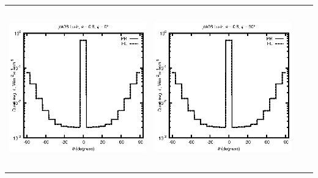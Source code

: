 \begin{tabular}{c c c c}
\includegraphics[height=7cm]{../eps/jok08_Lu_ir_fwd.eps} &
\includegraphics[height=7cm]{../eps/jok08_Lu_ir_cross.eps} \\
\end{tabular}

\pagebreak

